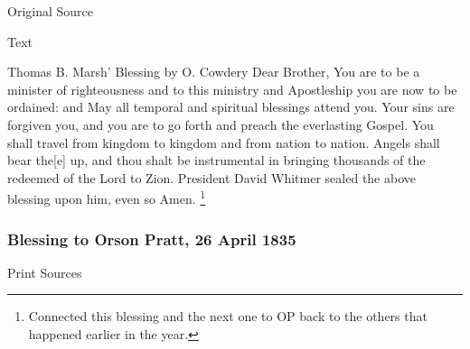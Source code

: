 			
			\begin{description}
				\item[Original Source]
			\end{description}
			
			
			\begin{description}
				\item[Text]
			\end{description}
			
				Thomas B. Marsh' Blessing by O. Cowdery Dear Brother, You are to be a minister of righteousness and to this ministry and Apostleship you are now to be ordained: and May all temporal and spiritual blessings attend you. Your sins are forgiven you, and you are to go forth and preach the everlasting Gospel. You shall travel from kingdom to kingdom and from nation to nation. Angels shall bear the[e] up, and thou shalt be instrumental in bringing thousands of the redeemed of the Lord to Zion. President David Whitmer sealed the above blessing upon him, even so Amen.%
					\footnote{%
						\label{EMS-1835-JS-26-APR-1835-TM-NOTE-blessings}%
						Connected this blessing and the next one to OP back to the others that happened earlier in the year.
						}
				
		\subsubsection{Blessing to Orson Pratt, 26 April 1835}
			\label{EMS-1835-JS-26-APR-1835-OP}
			
			\begin{description}
				\item[Print Sources]
			\end{description}

